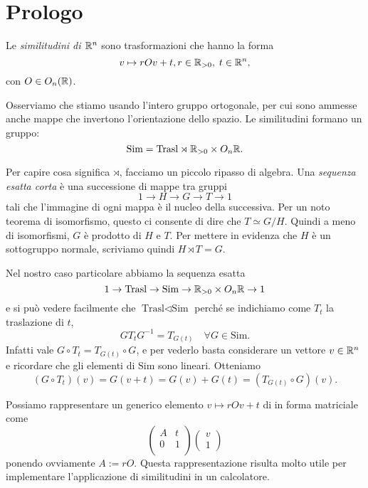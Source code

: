 
\section{Prologo}

\begin{definizione}
	Le \emph{similitudini di $\mathbb{R}^{n}$} sono trasformazioni che hanno la forma 
	$$v \mapsto rOv + t, r\in\mathbb{R}_{>0},\;t\in\mathbb{R}^{n},$$
	con $O\in O_{n}(\mathbb{R})$.
\end{definizione}
Osserviamo che stiamo usando l'intero gruppo ortogonale, per cui sono ammesse anche mappe che invertono l'orientazione dello spazio.
Le similitudini formano un gruppo: 
$$\text{Sim} = \text{Trasl} \rtimes \mathbb{R}_{>0} \times O_{n}\mathbb{R}.$$

Per capire cosa significa $\rtimes$, facciamo un piccolo ripasso di algebra. 
Una \emph{sequenza esatta corta} è una successione di mappe tra gruppi 
$$1 \to H \to G \to T \to 1$$
tali che l'immagine di ogni mappa è il nucleo della successiva. 
Per un noto teorema di isomorfismo, questo ci consente di dire che $T\simeq G/H$. 
Quindi a meno di isomorfismi, $G$ è prodotto di $H$ e $T$. 
Per mettere in evidenza che $H$ è un sottogruppo normale, scriviamo quindi $H \rtimes T = G$.

Nel nostro caso particolare abbiamo la sequenza esatta
$$1 \to \text{Trasl} \to \text{Sim} \to \mathbb{R}_{>0}\times O_{n}\mathbb{R} \to 1$$
e si può vedere facilmente che $\text{Trasl}\triangleleft\text{Sim}$ perché se indichiamo come $T_{t}$ la traslazione di $t$,
$$GT_{t}G^{-1} = T_{G(t)}\quad \forall G\in\text{Sim}.$$
Infatti vale $G\circ T_{t} = T_{G(t)}\circ G$, e per vederlo basta considerare un vettore $v\in\mathbb{R}^{n}$ e ricordare che gli elementi di $\text{Sim}$ sono lineari. 
Otteniamo 
$$(G\circ T_{t})(v) = G(v+t) = G(v) + G(t) = (T_{G(t)}\circ G)(v).$$

Possiamo rappresentare un generico elemento $v\mapsto rOv+t$ di  in forma matriciale come 
   $$\begin{pmatrix}
      A & t \\
      0 & 1 \\
   \end{pmatrix}
   \begin{pmatrix}
   v\\1
   \end{pmatrix}$$
ponendo ovviamente $A:=rO$. 
Questa rappresentazione risulta molto utile per implementare l'applicazione di similitudini in un calcolatore.

